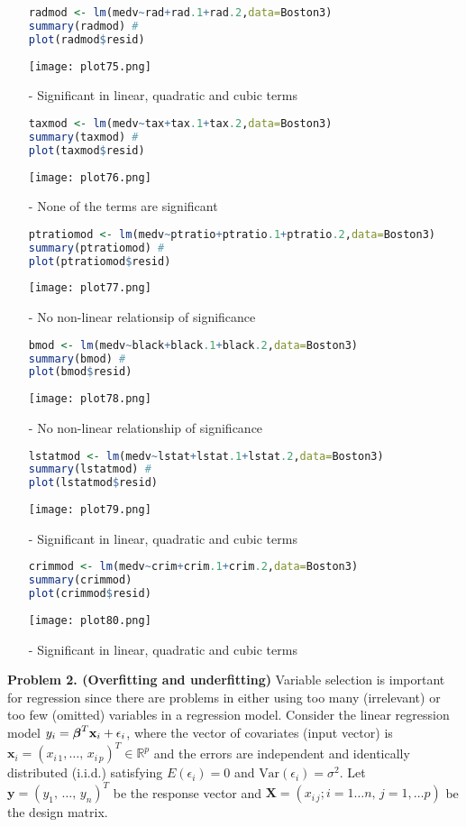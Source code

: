 \documentclass[11pt]{report}
\newcommand{\bfmath}[1]{\mbox{\boldmath$#1$\unboldmath}}
\begin{document}
\begin{itemize}
\begin{lstlisting}[language=R]
radmod <- lm(medv~rad+rad.1+rad.2,data=Boston3)
summary(radmod) # 
plot(radmod$resid)
\end{lstlisting}
\texttt{[image: plot75.png]}
\item[-] Significant in linear, quadratic and cubic terms

\begin{lstlisting}[language=R]
taxmod <- lm(medv~tax+tax.1+tax.2,data=Boston3)
summary(taxmod) # 
plot(taxmod$resid)
\end{lstlisting}
\texttt{[image: plot76.png]}
\item[-] None of the terms are significant

\begin{lstlisting}[language=R]
ptratiomod <- lm(medv~ptratio+ptratio.1+ptratio.2,data=Boston3)
summary(ptratiomod) # 
plot(ptratiomod$resid)
\end{lstlisting}
\texttt{[image: plot77.png]}
\item[-] No non-linear relationsip of significance

\begin{lstlisting}[language=R]
bmod <- lm(medv~black+black.1+black.2,data=Boston3)
summary(bmod) # 
plot(bmod$resid)
\end{lstlisting}
\texttt{[image: plot78.png]}
\item[-] No non-linear relationship of significance

\begin{lstlisting}[language=R]
lstatmod <- lm(medv~lstat+lstat.1+lstat.2,data=Boston3)
summary(lstatmod) # 
plot(lstatmod$resid)
\end{lstlisting}
\texttt{[image: plot79.png]}
\item[-] Significant in linear, quadratic and cubic terms

\begin{lstlisting}[language=R]
crimmod <- lm(medv~crim+crim.1+crim.2,data=Boston3)
summary(crimmod) 
plot(crimmod$resid)
\end{lstlisting}
\texttt{[image: plot80.png]}
\item[-] Significant in linear, quadratic and cubic terms
\end{itemize}

\newpage
\noindent
{\bf Problem 2. (Overfitting and underfitting)} Variable selection is important for regression since there are problems in either using too many (irrelevant) or too few (omitted) variables in a regression model. Consider the linear regression model $y_i=\bfmath{\beta}^T\mathbf{x}_i+\epsilon_i$, where the vector of covariates (input vector) is $\mathbf{x}_i=(x_{i\,1},\dots,\,x_{i\,p})^T\in\mathbb{R}^p$ and the errors are independent and identically distributed (i.i.d.) satisfying $E(\epsilon_i)=0$ and $\text{Var}(\epsilon_i)=\sigma^2$. Let $\mathbf{y}=(y_1,\,\dots,\,y_n)^T$ be the response vector and $\mathbf{X}=(x_{i\,j}; i=1\dots n, \,j=1,\dots p)$ be the design matrix. 
\end{document}
